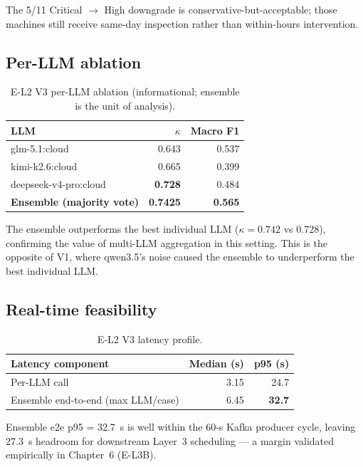 The 5/11 Critical $\to$ High downgrade is conservative-but-acceptable; those machines still receive same-day inspection rather than within-hours intervention.

\subsection{Per-LLM ablation}

\begin{table}[h!]
\centering
\caption{E-L2 V3 per-LLM ablation (informational; ensemble is the unit of analysis).}
\begin{tabular}{lrr}
\hline
\textbf{LLM} & \textbf{$\kappa$} & \textbf{Macro F1} \\
\hline
glm-5.1:cloud & 0.643 & 0.537 \\
kimi-k2.6:cloud & 0.665 & 0.399 \\
deepseek-v4-pro:cloud & \textbf{0.728} & 0.484 \\
\hline
\textbf{Ensemble (majority vote)} & \textbf{0.7425} & \textbf{0.565} \\
\hline
\end{tabular}
\end{table}

The ensemble outperforms the best individual LLM ($\kappa = 0.742$ vs 0.728), confirming the value of multi-LLM aggregation in this setting. This is the opposite of V1, where qwen3.5's noise caused the ensemble to underperform the best individual LLM.

\subsection{Real-time feasibility}

\begin{table}[h!]
\centering
\caption{E-L2 V3 latency profile.}
\begin{tabular}{lrr}
\hline
\textbf{Latency component} & \textbf{Median (s)} & \textbf{p95 (s)} \\
\hline
Per-LLM call & 3.15 & 24.7 \\
Ensemble end-to-end (max LLM/case) & 6.45 & \textbf{32.7} \\
\hline
\end{tabular}
\end{table}

Ensemble e2e p95 = 32.7~s is well within the 60-s Kafka producer cycle, leaving 27.3~s headroom for downstream Layer~3 scheduling --- a margin validated empirically in Chapter~6 (E-L3B).

